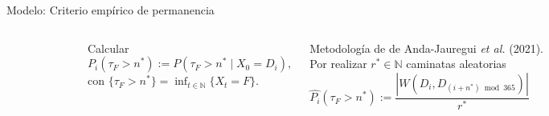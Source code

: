 \documentclass[aspectratio=169]{beamer}
\begin{document}
\begin{frame}{Modelo: Criterio  empírico de permanencia}
\begin{columns}
\begin{figure}[ht]
{\begin{tikzpicture}[
					>=Stealth,
					state/.style={draw, circle, minimum size=14mm, line width=0.8pt},
					invisible/.style={circle, minimum size=14mm, draw=none},
					arrow/.style={->, line width=0.8pt}
					]
				\end{tikzpicture}
			}
		\end{figure}
		Calcular
		$$P_i(\tau_F > n^*):=P(\tau_F > n^*\mid X_0=D_i),$$ con $\displaystyle\{\tau_F > n^*\}= \inf_{t\in \mathbb{N}} \{X_t= F\}.$\\
		
		\pause
		\begin{block}{Metodología de de Anda-Jauregui \textit{et al.} (2021).}
			Por realizar $r^*\in  \mathbb{N}$ caminatas aleatorias
			$$\widehat{P_i}(\tau_F > n^*):=\frac{|W(D_{i}, D_{(i+n^*)\bmod{365}})|}{r^*} \phantom{\geq \zeta^*.}$$
		\end{block}
		\phantom{Intervalos de $(1-\alpha)100\%$ de confianza por bootstrap y jackknife.}
	\end{columns}
\end{frame}
\end{document}
